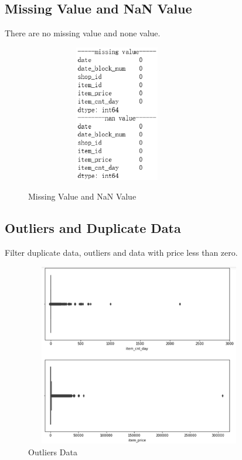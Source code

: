 \subsection{Missing Value and NaN Value} There are no missing value and none value.
	\begin{figure}[htb]
	\centering
	\includegraphics[width=8cm, height=6cm]{figures/miss.eps}\\
	\caption{Missing Value and NaN Value
	}\label{straddltimeScale}
\end{figure}
\subsection{Outliers and Duplicate Data} Filter duplicate data, outliers and data with price less than zero.
\begin{figure}[htb]
	\centering
	\includegraphics[width=10cm, height=8cm]{figures/outliers.eps}
	\caption{Outliers Data
	}\label{straddltimeScale}
\end{figure}
